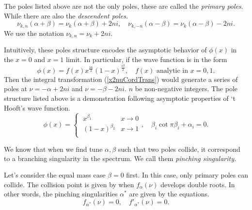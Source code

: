 \documentclass{article}
\newcommand{\bref}[1]{(\ref{#1})}
\begin{document}
The poles listed above are not the only poles, these are called the \emph{primary poles}. While there are also the \emph{descendent poles.}
\[
	\nu_{k, n}(\alpha + \beta) = \nu_{k}(\alpha + \beta) + 2ni, \quad
	\nu_{k, -n}(\alpha - \beta) = \nu_{k}(\alpha - \beta) - 2ni.
\]
We use the notation $\nu_{k, n} = \nu_{k} + 2ni$.

Intuitively, these poles structure encodes the asymptotic behavior of $\phi(x)$ in the $x =0 $ and $x =1 $ limit. In particular, if the wave function is in the form
\[
	\phi(x) = f(x)x^{\frac{i\alpha}{2}}(1-x)^{\frac{i\beta}{2}}, \quad \textrm{$f(x)$ analytic in $x =0, 1$.}
\]
Then the integral transformation \bref{x2nuCordTrans} would generate a series of poles at $\nu = -\alpha + 2ni$ and $\nu = -\beta - 2ni$. $n$ be non-negative integers. The pole structure listed above is a demonstration following asymptotic properties of `t Hooft's wave function.
\[
	\phi(x) =
	\begin{cases}
		\;x^{\beta_1}     & x \rightarrow 0 \\
		\;(1-x)^{\beta_2} & x \rightarrow 1 \\
	\end{cases}, \quad \beta_i\cot\pi \beta_i + \alpha_i =0.
\]

We know that when we find tune $\alpha, \beta$ such that two poles collide, it correspond to a branching singularity in the spectrum. We call them \emph{pinching singularity.}

Let's consider the equal mass case $\beta =0 $ first. In this case, only primary poles can collide. The collision point is given by when $f_{\alpha}(\nu)$ develops double roots. In other words, the pinching singularities $\alpha^*$ are given by the equations.
\[
	f_{\alpha^*}(\nu) =0, \quad f{}'_{\alpha^*}(\nu) =0.
\]
\nocite{*}
\printbibliography
\end{document}
